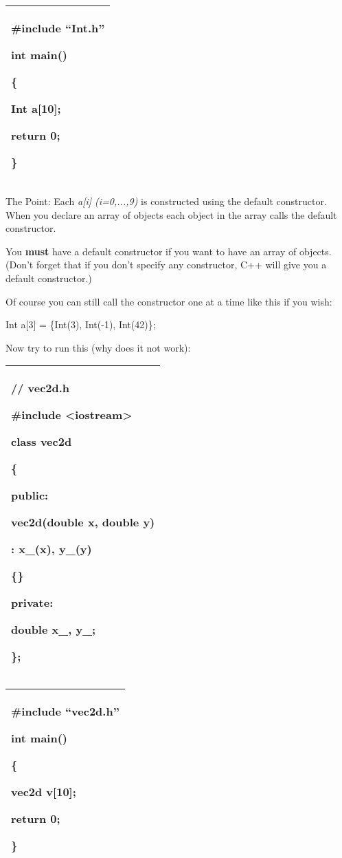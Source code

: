 \documentclass[
]{article}
\begin{document}
\begin{longtable}[]{@{}l@{}}
\toprule
\endhead
\begin{minipage}[t]{0.97\columnwidth}\raggedright
\#include ``Int.h''

int main()

\{

Int a{[}10{]};

return 0;

\}\strut
\end{minipage}\tabularnewline
\bottomrule
\end{longtable}

The Point: Each \emph{a{[}i{]} (i=0,...,9)} is constructed using the
default constructor. When you declare an array of objects each object in
the array calls the default constructor.

You \textbf{must} have a default constructor if you want to have an
array of objects. (Don't forget that if you don't specify any
constructor, C++ will give you a default constructor.)

Of course you can still call the constructor one at a time like this if
you wish:

Int a{[}3{]} = \{Int(3), Int(-1), Int(42)\};

Now try to run this (why does it not work):

\begin{longtable}[]{@{}l@{}}
\toprule
\endhead
\begin{minipage}[t]{0.97\columnwidth}\raggedright
// vec2d.h

\#include \textless iostream\textgreater{}

class vec2d

\{

public:

vec2d(double x, double y)

: x\_(x), y\_(y)

\{\}

private:

double x\_, y\_;

\};\strut
\end{minipage}\tabularnewline
\bottomrule
\end{longtable}

\begin{longtable}[]{@{}l@{}}
\toprule
\endhead
\begin{minipage}[t]{0.97\columnwidth}\raggedright
\#include ``vec2d.h''

int main()

\{

vec2d v{[}10{]};

return 0;

\}\strut
\end{minipage}\tabularnewline
\bottomrule
\end{longtable}
\end{document}
